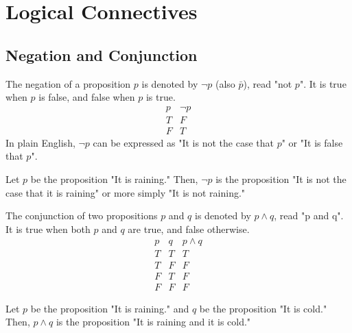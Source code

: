 \section{Logical Connectives}
\subsection{Negation and Conjunction}
\begin{definition}[Negation]
    The negation of a proposition $p$ is denoted by $\neg p$ (also $\bar{p}$), read "not $p$". It is true when $p$ is false, and false when $p$ is true.
    \[
        \begin{array}{c|c}
            p & \neg p \\
            \hline
            T & F \\
            F & T
        \end{array}
    \]
    In plain English, $\neg p$ can be expressed as "It is not the case that $p$" or "It is false that $p$".
\end{definition}

\begin{eg}
    Let \(p\) be the proposition "It is raining." Then, \(\neg p\) is the proposition "It is not the case that it is raining" or more simply "It is not raining."
\end{eg}

\begin{definition}[Conjunction]
    The conjunction of two propositions $p$ and $q$ is denoted by $p \land q$, read "p and q". It is true when both $p$ and $q$ are true, and false otherwise.
    \[
        \begin{array}{c|c|c}
            p & q & p \land q \\
            \hline
            T & T & T \\
            T & F & F \\
            F & T & F \\
            F & F & F
        \end{array}
    \]
\end{definition}

\begin{eg}
    Let \(p\) be the proposition "It is raining." and \(q\) be the proposition "It is cold." Then, \(p \land q\) is the proposition "It is raining and it is cold."
\end{eg}

